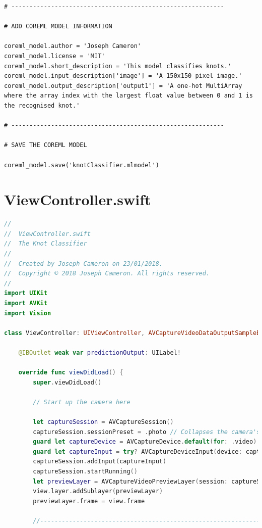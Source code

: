 \documentclass{l4proj}
\begin{document}
\begin{appendices}
\begin{lstlisting}
# -----------------------------------------------------------

# ADD COREML MODEL INFORMATION

coreml_model.author = 'Joseph Cameron'
coreml_model.license = 'MIT'
coreml_model.short_description = 'This model classifies knots.'
coreml_model.input_description['image'] = 'A 150x150 pixel image.'
coreml_model.output_description['output1'] = 'A one-hot MultiArray where the array index with the largest float value between 0 and 1 is the recognised knot.'

# -----------------------------------------------------------

# SAVE THE COREML MODEL

coreml_model.save('knotClassifier.mlmodel')

\end{lstlisting}


\chapter{ViewController.swift}
\label{appendix:SwiftViewController}
\begin{lstlisting}[language=swift]
//
//  ViewController.swift
//  The Knot Classifier
//
//  Created by Joseph Cameron on 23/01/2018.
//  Copyright © 2018 Joseph Cameron. All rights reserved.
//
import UIKit
import AVKit
import Vision

class ViewController: UIViewController, AVCaptureVideoDataOutputSampleBufferDelegate {
    
    @IBOutlet weak var predictionOutput: UILabel!
    
    override func viewDidLoad() {
        super.viewDidLoad()
        
        // Start up the camera here
        
        let captureSession = AVCaptureSession()
        captureSession.sessionPreset = .photo // Collapses the camera's view on the screen.
        guard let captureDevice = AVCaptureDevice.default(for: .video) else { return }
        guard let captureInput = try? AVCaptureDeviceInput(device: captureDevice) else { return }
        captureSession.addInput(captureInput)
        captureSession.startRunning()
        let previewLayer = AVCaptureVideoPreviewLayer(session: captureSession)
        view.layer.addSublayer(previewLayer)
        previewLayer.frame = view.frame
        
        //----------------------------------------------------------------------------------
        

\end{lstlisting}
\end{appendices}
\end{document}
